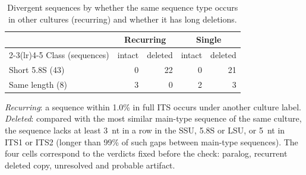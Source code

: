 \begin{table}[htbp]\centering
\begin{threeparttable}
\caption{Divergent sequences by whether the same sequence type occurs in other cultures (recurring) and whether it has
long deletions.}
\label{tab:artefacts}
\footnotesize\setlength{\tabcolsep}{4pt}
\begin{tabular}{lrrrr}
\toprule
 & \multicolumn{2}{c}{Recurring} & \multicolumn{2}{c}{Single}\\
\cmidrule(lr){2-3}\cmidrule(lr){4-5}
Class (sequences) & intact & deleted & intact & deleted\\
\midrule
Short 5.8S (43) & 0 & 22 & 0 & 21\\
Same length (8) & 3 & 0 & 2 & 3\\
\bottomrule
\end{tabular}
\begin{tablenotes}\footnotesize
\item \emph{Recurring}: a sequence within 1.0\% in full ITS occurs under another culture label. \emph{Deleted}: compared
with the most similar main-type sequence of the same culture, the sequence lacks at least 3~nt in a row in the SSU,
5.8S or LSU, or 5~nt in ITS1 or ITS2 (longer than 99\% of such gaps between main-type sequences). The four
cells correspond to the verdicts fixed before the check: paralog, recurrent deleted copy, unresolved and probable
artifact.
\end{tablenotes}
\end{threeparttable}
\end{table}
